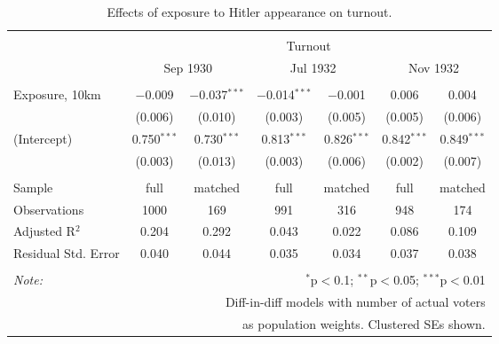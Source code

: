 
\begin{table}[!htbp] \centering 
  \caption{Effects of exposure to Hitler appearance on turnout.} 
  \label{tab:nsdap-turnout-dd-1} 
\begin{tabular}{@{\extracolsep{5pt}}lcccccc} 
\\[-1.8ex]\hline 
\hline \\[-1.8ex] 
 & \multicolumn{6}{c}{Turnout} \\ 
\cline{2-7} 
 & \multicolumn{2}{c}{Sep 1930} & \multicolumn{2}{c}{Jul 1932} & \multicolumn{2}{c}{Nov 1932} \\ 
\hline \\[-1.8ex] 
 Exposure, 10km & $-$0.009 & $-$0.037$^{***}$ & $-$0.014$^{***}$ & $-$0.001 & 0.006 & 0.004 \\ 
  & (0.006) & (0.010) & (0.003) & (0.005) & (0.005) & (0.006) \\ 
  (Intercept) & 0.750$^{***}$ & 0.730$^{***}$ & 0.813$^{***}$ & 0.826$^{***}$ & 0.842$^{***}$ & 0.849$^{***}$ \\ 
  & (0.003) & (0.013) & (0.003) & (0.006) & (0.002) & (0.007) \\ 
 \hline \\[-1.8ex] 
Sample & full & matched & full & matched & full & matched \\ 
Observations & 1000 & 169 & 991 & 316 & 948 & 174 \\ 
Adjusted R$^{2}$ & 0.204 & 0.292 & 0.043 & 0.022 & 0.086 & 0.109 \\ 
Residual Std. Error & 0.040 & 0.044 & 0.035 & 0.034 & 0.037 & 0.038 \\ 
\hline 
\hline \\[-1.8ex] 
\textit{Note:}  & \multicolumn{6}{r}{$^{*}$p$<$0.1; $^{**}$p$<$0.05; $^{***}$p$<$0.01} \\ 
 & \multicolumn{6}{r}{Diff-in-diff models with number of actual voters} \\ 
 & \multicolumn{6}{r}{as population weights. Clustered SEs shown.} \\ 
\end{tabular} 
\end{table} 
